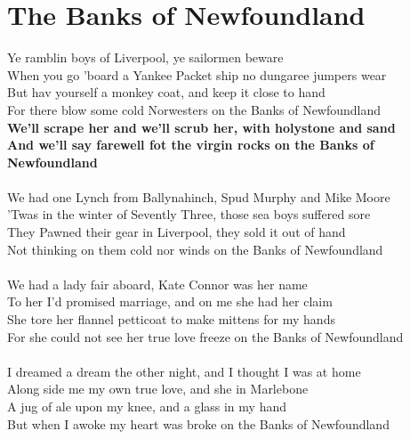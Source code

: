 \documentclass[letterpaper,9pt]{article}
\begin{document}
\newpage
\section{The Banks of Newfoundland}

\noindent
Ye ramblin boys of Liverpool, ye sailormen beware
\\When you go 'board a Yankee Packet ship no dungaree jumpers wear
\\But hav yourself a monkey coat, and keep it close to hand
\\For there blow some cold Norwesters on the Banks of Newfoundland
\\\textbf{We'll scrape her and we'll scrub her, with holystone and sand
\\And we'll say farewell fot the virgin rocks on the Banks of Newfoundland}
\\
\\We had one Lynch from Ballynahinch, Spud Murphy and Mike Moore
\\'Twas in the winter of Sevently Three, those sea boys suffered sore
\\They Pawned their gear in Liverpool, they sold it out of hand
\\Not thinking on them cold nor winds on the Banks of Newfoundland
\\
\\We had a lady fair aboard, Kate Connor was her name
\\To her I'd promised marriage, and on me she had her claim
\\She tore her flannel petticoat to make mittens for my hands
\\For she could not see her true love freeze on the Banks of Newfoundland
\\
\\I dreamed a dream the other night, and I thought I was at home
\\Along side me my own true love, and she in Marlebone
\\A jug of ale upon my knee, and a glass in my hand
\\But when I awoke my heart was broke on the Banks of Newfoundland

\newpage
\end{document}
